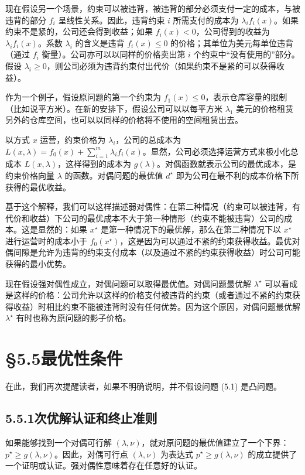 \documentclass[UTF8, 12pt, fontset=fandol, oneside]{ctexart}
\begin{document}
现在假设另一个场景，约束可以被违背，被违背的部分必须支付一定的成本，与被违背的部分 $f_i$ 呈线性关系。因此，违背约束 $i$ 所需支付的成本为 $\lambda_i f_i(x)$。如果约束不是紧的，公司还会得到收益；如果 $f_i(x)<0$，公司得到的收益为 $\lambda_i f_i(x)$。系数 $\lambda_i$ 的含义是违背 $f_i(x)\leq 0$ 的价格；其单位为美元每单位违背（通过 $f_i$ 衡量）。公司亦可以以同样的价格卖出第 $i$ 个约束中“没有使用的”部分。假设 $\lambda_i\geq 0$，则公司必须为违背约束付出代价（如果约束不是紧的可以获得收益）。

作为一个例子，假设原问题的第一个约束为 $f_1(x)\leq 0$，表示仓库容量的限制（比如说平方米）。在新的安排下，假设公司可以以每平方米 $\lambda_1$ 美元的价格租赁另外的仓库空间，也可以以同样的价格将不使用的空间租赁出去。

以方式 $x$ 运营，约束价格为 $\lambda_i$，公司的总成本为 $L(x,\lambda)=f_0(x)+\sum_{i=1}^m\lambda_i f_i(x)$。显然，公司必须选择运营方式来极小化总成本 $L(x,\lambda)$，这样得到的成本为 $g(\lambda)$。对偶函数就表示公司的最优成本，是约束价格向量 $\lambda$ 的函数。对偶问题的最优值 $d^\star$ 即为公司在最不利的成本价格下所获得的最优收益。

基于这个解释，我们可以这样描述弱对偶性：在第二种情况（约束可以被违背，有代价和收益）下公司的最优成本不大于第一种情形（约束不能被违背）公司的成本。这是显然的：如果 $x^\star$ 是第一种情况下的最优解，那么在第二种情况下以 $x^\star$ 进行运营时的成本小于 $f_0(x^\star)$，这是因为可以通过不紧的约束获得收益。最优对偶间隙是允许为违背的约束支付成本（以及通过不紧的约束获得收益）时公司可能获得的最小优势。

现在假设强对偶性成立，对偶问题可以取得最优值。对偶问题最优解 $\lambda^\star$ 可以看成是这样的价格：公司允许以这样的价格支付被违背的约束（或者通过不紧的约束获得收益）时相比约束不能被违背时没有任何优势。因为这个原因，对偶问题最优解 $\lambda^\star$ 有时也称为原问题的影子价格。

\section*{§5.5\quad 最优性条件}

在此，我们再次提醒读者，如果不明确说明，并不假设问题 (5.1) 是凸问题。

\subsection*{5.5.1\quad 次优解认证和终止准则}

如果能够找到一个对偶可行解 $(\lambda,\nu)$，就对原问题的最优值建立了一个下界：$p^\star\geq g(\lambda,\nu)$。因此，对偶可行点 $(\lambda,\nu)$ 为表达式 $p^\star\geq g(\lambda,\nu)$ 的成立提供了一个证明或认证。强对偶性意味着存在任意好的认证。
\end{document}
